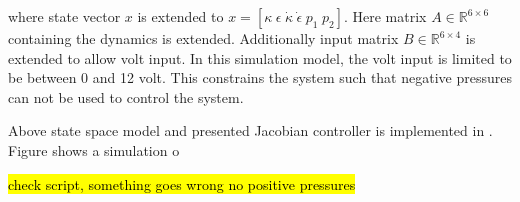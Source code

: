 where state vector $x$ is extended to $x = [\kappa \hspace{3pt} \epsilon \hspace{3pt} \dot{\kappa} \hspace{3pt} \dot{\epsilon} \hspace{3pt} p_1 \hspace{3pt} p_2]$. Here matrix $A \in \mathbb{R}^{6\times 6}$ containing the dynamics is extended. Additionally input matrix $B \in \mathbb{R}^{6\times 4}$ is extended to allow volt input. In this simulation model, the volt input is limited to be between 0 and 12 volt. This constrains the system such that negative pressures can not be used to control the system. 

Above state space model and presented Jacobian controller is implemented in \MATLAB. Figure  shows a simulation o







\hl{check script, something goes wrong no positive pressures}